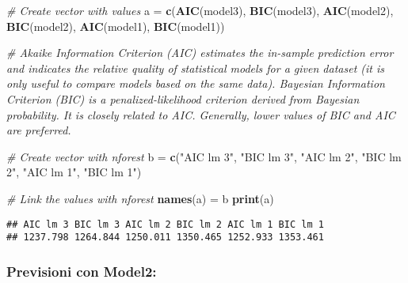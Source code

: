 \documentclass[
]{article}
\newenvironment{Shaded}{\begin{snugshade}}{\end{snugshade}}
\newcommand{\CommentTok}[1]{\textcolor[rgb]{0.56,0.35,0.01}{\textit{#1}}}
\newcommand{\FunctionTok}[1]{\textcolor[rgb]{0.13,0.29,0.53}{\textbf{#1}}}
\newcommand{\NormalTok}[1]{#1}
\newcommand{\OtherTok}[1]{\textcolor[rgb]{0.56,0.35,0.01}{#1}}
\newcommand{\StringTok}[1]{\textcolor[rgb]{0.31,0.60,0.02}{#1}}
\begin{document}
\begin{Shaded}
\begin{Highlighting}[]
\CommentTok{\# Create vector with values}
\NormalTok{a }\OtherTok{=} \FunctionTok{c}\NormalTok{(}\FunctionTok{AIC}\NormalTok{(model3), }\FunctionTok{BIC}\NormalTok{(model3), }\FunctionTok{AIC}\NormalTok{(model2), }\FunctionTok{BIC}\NormalTok{(model2), }\FunctionTok{AIC}\NormalTok{(model1), }\FunctionTok{BIC}\NormalTok{(model1))}

\CommentTok{\# Akaike Information Criterion (AIC) estimates the in{-}sample prediction error and indicates the relative quality of statistical models for a given dataset (it is only useful to compare models based on the same data). Bayesian Information Criterion (BIC) is a penalized{-}likelihood criterion derived from Bayesian probability. It is closely related to AIC. Generally, lower values of BIC and AIC are preferred.}

\CommentTok{\# Create vector with nforest}
\NormalTok{b }\OtherTok{=} \FunctionTok{c}\NormalTok{(}\StringTok{"AIC lm 3"}\NormalTok{, }\StringTok{"BIC lm 3"}\NormalTok{, }\StringTok{"AIC lm 2"}\NormalTok{, }\StringTok{"BIC lm 2"}\NormalTok{, }\StringTok{"AIC lm 1"}\NormalTok{, }\StringTok{"BIC lm 1"}\NormalTok{)}

\CommentTok{\# Link the values with nforest}
\FunctionTok{names}\NormalTok{(a) }\OtherTok{=}\NormalTok{ b}
\FunctionTok{print}\NormalTok{(a)}
\end{Highlighting}
\end{Shaded}

\begin{verbatim}
## AIC lm 3 BIC lm 3 AIC lm 2 BIC lm 2 AIC lm 1 BIC lm 1 
## 1237.798 1264.844 1250.011 1350.465 1252.933 1353.461
\end{verbatim}

\hypertarget{previsioni-con-model2}{%
\subsubsection{Previsioni con Model2:}\label{previsioni-con-model2}}
\end{document}
